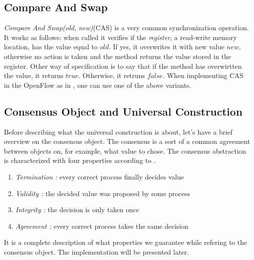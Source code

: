 \documentclass{article}
\theoremstyle{remark}
\begin{document}
\subsection{Compare And Swap}
\emph{Compare And Swap(old, new)}(CAS) is a very common synchronization operation. It works as follows: when called it verifies if the \emph{register}, a read-write memory location, has the value equal to $old$. If yes, it overwrites it with new value $new$, otherwise no action is taken and the method returns the value stored in the register. Other way of specification is to say that if the method has overwirtten the value, it returns $true$. Otherwise, it retruns $false$.
When implementing CAS in the OpenFlow as in \cite{In-band}, one can use one of the above variants. 
\subsection{Consensus Object and Universal Construction}
Before describing what the universal construction is about, let's have a brief overview on the consensus object. The consensus is a sort of a common agreement between objects on, for example, what value to chose.
The consensus abstraction is characterized with four properties according to \cite{Guerraoui:2010:IRD:1951643}.
\begin{enumerate}
\item \emph{Termination :} every correct process finally decides value
\item \emph{Validity :} the decided value was proposed by some process
\item \emph{Integrity :} the decision is only taken once
\item \emph{Agreement :} every correct process takes the same decision
\end{enumerate}
It is a complete description of what properties we guarantee while refering to the consensus object. The implementation will be presented later.
\end{document}
